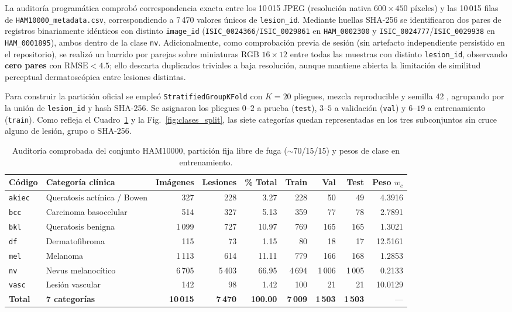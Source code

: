 \documentclass[conference]{IEEEtran}
\begin{document}
La auditor\'ia program\'atica comprob\'o correspondencia exacta entre los 10\,015 JPEG (resoluci\'on nativa $600\times450$ p\'ixeles) y las 10\,015 filas de \texttt{HAM10000\_metadata.csv}, correspondiendo a 7\,470 valores \'unicos de \texttt{lesion\_id}. Mediante huellas SHA-256 se identificaron dos pares de registros binariamente id\'enticos con distinto \texttt{image\_id} (\texttt{ISIC\_0024366}/\texttt{ISIC\_0029861} en \texttt{HAM\_0002300} y \texttt{ISIC\_0024777}/\texttt{ISIC\_0029938} en \texttt{HAM\_0001895}), ambos dentro de la clase \texttt{nv}. Adicionalmente, como comprobaci\'on previa de sesi\'on (sin artefacto independiente persistido en el repositorio), se realiz\'o un barrido por parejas sobre miniaturas RGB $16\times12$ entre todas las muestras con distinto \texttt{lesion\_id}, observando \textbf{cero pares} con $\mathrm{RMSE}<4.5$; ello descarta duplicados triviales a baja resoluci\'on, aunque mantiene abierta la limitaci\'on de similitud perceptual dermatosc\'opica entre lesiones distintas.

Para construir la partici\'on oficial se emple\'o \texttt{StratifiedGroupKFold} con $K=20$ pliegues, mezcla reproducible y semilla 42 \cite{sklearndocs}, agrupando por la uni\'on de \texttt{lesion\_id} y hash SHA-256. Se asignaron los pliegues $0\text{--}2$ a prueba (\texttt{test}), $3\text{--}5$ a validaci\'on (\texttt{val}) y $6\text{--}19$ a entrenamiento (\texttt{train}). Como refleja el Cuadro~\ref{tab:split} y la Fig.~\ref{fig:clases_split}, las siete categor\'ias quedan representadas en los tres subconjuntos sin cruce alguno de lesi\'on, grupo o SHA-256.

\begin{table}[t]
\centering
\caption{Auditor\'ia comprobada del conjunto HAM10000, partici\'on fija libre de fuga ($\sim$70/15/15) y pesos de clase en entrenamiento.}
\label{tab:split}
\begin{tabular}{llrrrrrrr}\toprule
C\'odigo & Categor\'ia cl\'inica & Im\'agenes & Lesiones & \% Total & Train & Val & Test & Peso $w_c$ \\ \midrule
\texttt{akiec} & Queratosis act\'inica / Bowen & 327 & 228 & 3.27 & 228 & 50 & 49 & 4.3916 \\
\texttt{bcc} & Carcinoma basocelular & 514 & 327 & 5.13 & 359 & 77 & 78 & 2.7891 \\
\texttt{bkl} & Queratosis benigna & 1\,099 & 727 & 10.97 & 769 & 165 & 165 & 1.3021 \\
\texttt{df} & Dermatofibroma & 115 & 73 & 1.15 & 80 & 18 & 17 & 12.5161 \\
\texttt{mel} & Melanoma & 1\,113 & 614 & 11.11 & 779 & 166 & 168 & 1.2853 \\
\texttt{nv} & Nevus melanoc\'itico & 6\,705 & 5\,403 & 66.95 & 4\,694 & 1\,006 & 1\,005 & 0.2133 \\
\texttt{vasc} & Lesi\'on vascular & 142 & 98 & 1.42 & 100 & 21 & 21 & 10.0129 \\ \midrule
\textbf{Total} & \textbf{7 categor\'ias} & \textbf{10\,015} & \textbf{7\,470} & \textbf{100.00} & \textbf{7\,009} & \textbf{1\,503} & \textbf{1\,503} & --- \\
\bottomrule
\end{tabular}
\end{table}
\end{document}

